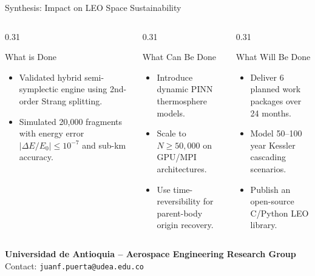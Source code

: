 \documentclass[aspectratio=169,10pt]{beamer}
\begin{document}
\begin{frame}{Synthesis: Impact on LEO Space Sustainability}
    \begin{columns}[t]
        \begin{column}{0.31\textwidth}
            \begin{block}{What is Done}
                \small
                \begin{itemize}
                    \setlength{\itemsep}{2pt}
                    \item Validated hybrid semi-symplectic engine using 2nd-order Strang splitting.
                    \item Simulated 20,000 fragments with energy error $|\Delta E/E_0| \le 10^{-7}$ and sub-km accuracy.
                \end{itemize}
            \end{block}
        \end{column}

        \begin{column}{0.31\textwidth}
            \begin{exampleblock}{What Can Be Done}
                \small
                \begin{itemize}
                    \setlength{\itemsep}{2pt}
                    \item Introduce dynamic PINN thermosphere models.
                    \item Scale to $N \ge 50,000$ on GPU/MPI architectures.
                    \item Use time-reversibility for parent-body origin recovery.
                \end{itemize}
            \end{exampleblock}
        \end{column}

        \begin{column}{0.31\textwidth}
            \begin{alertblock}{What Will Be Done}
                \small
                \begin{itemize}
                    \setlength{\itemsep}{2pt}
                    \item Deliver 6 planned work packages over 24 months.
                    \item Model 50--100 year Kessler cascading scenarios.
                    \item Publish an open-source C/Python LEO library.
                \end{itemize}
            \end{alertblock}
        \end{column}
    \end{columns}

    \vspace{0.25cm}
    \centering
    \footnotesize
    \textbf{\textcolor{UdeAGreen}{Universidad de Antioquia -- Aerospace Engineering Research Group}} \\
    Contact: \texttt{juanf.puerta@udea.edu.co}
\end{frame}
\end{document}
